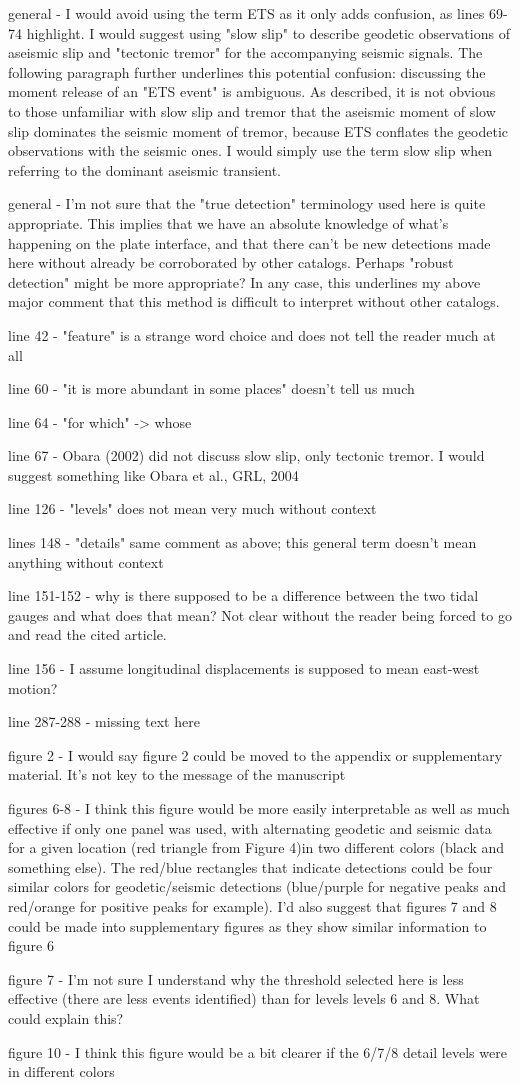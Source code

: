 \documentclass[letterpaper, 12pt]{article}
\begin{document}
general - I would avoid using the term ETS as it only adds confusion, as lines 69-74 highlight. I would suggest using "slow slip" to describe geodetic observations of aseismic slip and "tectonic tremor" for the accompanying seismic signals. The following paragraph further underlines this potential confusion: discussing the moment release of an "ETS event" is ambiguous. As described, it is not obvious to those unfamiliar with slow slip and tremor that the aseismic moment of slow slip dominates the seismic moment of tremor, because ETS conflates the geodetic observations with the seismic ones. I would simply use the term slow slip when referring to the dominant aseismic transient.

general - I'm not sure that the "true detection" terminology used here is quite appropriate. This implies that we have an absolute knowledge of what's happening on the plate interface, and that there can't be new detections made here without already be corroborated by other catalogs. Perhaps "robust detection" might be more appropriate? In any case, this underlines my above major comment that this method is difficult to interpret without other catalogs.

line 42 - "feature" is a strange word choice and does not tell the reader much at all

line 60 - "it is more abundant in some places" doesn't tell us much

line 64 - "for which" -> whose

line 67 - Obara (2002) did not discuss slow slip, only tectonic tremor. I would suggest something like Obara et al., GRL, 2004

line 126 - "levels" does not mean very much without context

lines 148 - "details" same comment as above; this general term doesn't mean anything without context

line 151-152 - why is there supposed to be a difference between the two tidal gauges and what does that mean? Not clear without the reader being forced to go and read the cited article.

line 156 - I assume longitudinal displacements is supposed to mean east-west motion?

line 287-288 - missing text here

figure 2 - I would say figure 2 could be moved to the appendix or supplementary material. It's not key to the message of the manuscript

figures 6-8 - I think this figure would be more easily interpretable as well as much effective if only one panel was used, with alternating geodetic and seismic data for a given location (red triangle from Figure 4)in two different colors (black and something else). The red/blue rectangles that indicate detections could be four similar colors for geodetic/seismic detections (blue/purple for negative peaks and red/orange for positive peaks for example). I'd also suggest that figures 7 and 8 could be made into supplementary figures as they show similar information to figure 6

figure 7 - I'm not sure I understand why the threshold selected here is less effective (there are less events identified) than for levels levels 6 and 8. What could explain this?

figure 10 - I think this figure would be a bit clearer if the 6/7/8 detail levels were in different colors
\end{document}
